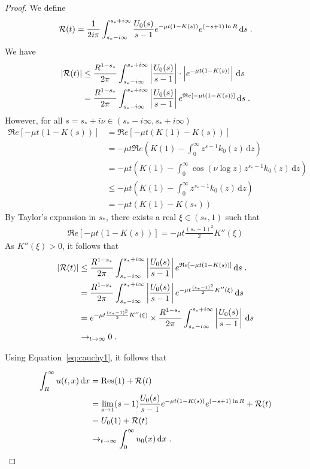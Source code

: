 \documentclass[11pt]{amsart}
\renewcommand{\Re}{\mathfrak{R}e}
\newcommand{\diff}{\,\mathrm{d}}
\begin{document}
\begin{proof}
We define
\begin{align*}
    \Rcal(t) = \frac{1}{2i\pi} \int_{s_*-i\infty}^{s_*+i\infty} \frac{U_0(s)}{s-1} e^{-\mu t(1 - K(s))} e^{(-s+1)\ln R} \diff s
    \eqfinp
\end{align*}
We have 
\begin{align*}
    |\Rcal(t)| 
    &\leq \frac{R^{1-s_*}}{2\pi} \int_{s_*-i\infty}^{s_*+i\infty} \left|\frac{U_0(s) }{s-1}\right| \cdot \left|e^{-\mu t(1 - K(s))}\right| \diff s \\
    &= \frac{R^{1-s_*}}{2\pi} \int_{s_*-i\infty}^{s_*+i\infty} \left|\frac{U_0(s) }{s-1}\right| e^{\Re[-\mu t(1 - K(s))]} \diff s
    \eqfinp
\end{align*}
However, for all $s = s_* + i\nu \in (s_*-i \infty, s_* + i \infty)$
\begin{align*}
    \Re[-\mu t(1 - K(s))] 
    &= \Re[-\mu t(K(1) - K(s))] \\
    &= -\mu t \Re\left( K(1) - \int_0^\infty z^{s-1}k_0(z)\diff z  \right) \\
    &=  -\mu t\left( K(1) - \int_0^\infty \cos(\nu \log z) z^{s_*-1}k_0(z)\diff z  \right) \\
    &\leq -\mu t \left( K(1) - \int_0^\infty z^{s_*-1}k_0(z)\diff z  \right) \\
    &= -\mu t \left( K(1) - K(s_*)  \right)
\end{align*}
By Taylor's expansion in $s_*$, there exists a real $\xi \in (s_*, 1)$ such that 
\begin{align*}
    \Re[-\mu t(1 - K(s))] = - \mu t \frac{(s_*-1)^2}{2}  K''(\xi) 
\end{align*}
As $ K''(\xi) > 0$, it follows that 
\begin{align*}
    |\Rcal(t)| 
    &\leq \frac{R^{1-s_*}}{2\pi} \int_{s_*-i\infty}^{s_*+i\infty} \left|\frac{U_0(s) }{s-1}\right| e^{\Re[-\mu t(1 - K(s))]} \diff s
    \eqfinp \\
    &= \frac{R^{1-s_*}}{2\pi} \int_{s_*-i\infty}^{s_*+i\infty} \left|\frac{U_0(s) }{s-1}\right| e^{- \mu t \frac{(s_*-1)^2}{2}  K''(\xi) } \diff s \\
    &= e^{- \mu t \frac{(s_*-1)^2}{2}  K''(\xi)} \times \frac{R^{1-s_*}}{2\pi} \int_{s_*-i\infty}^{s_*+i\infty} \left|\frac{U_0(s) }{s-1}\right| \diff s \\
    &\to_{t \to \infty} 0
    \eqfinp
\end{align*}

Using Equation~\ref{eq:cauchy1}, it follows that 

\begin{align*}
    \int_R^\infty u(t,x) \diff x &= \mathrm{Res(1)} + \Rcal(t) \\
    &= \lim_{s \to 1} (s-1)\frac{U_0(s)}{s-1} e^{-\mu t(1 - K(s))} e^{(-s+1)\ln R}  + \Rcal(t)\\
    &= U_0(1) + \Rcal(t)\\
    &\to_{t \to \infty} \int_0^\infty u_0(x) \diff x
    \eqfinp
\end{align*}


\end{proof}
\end{document}
